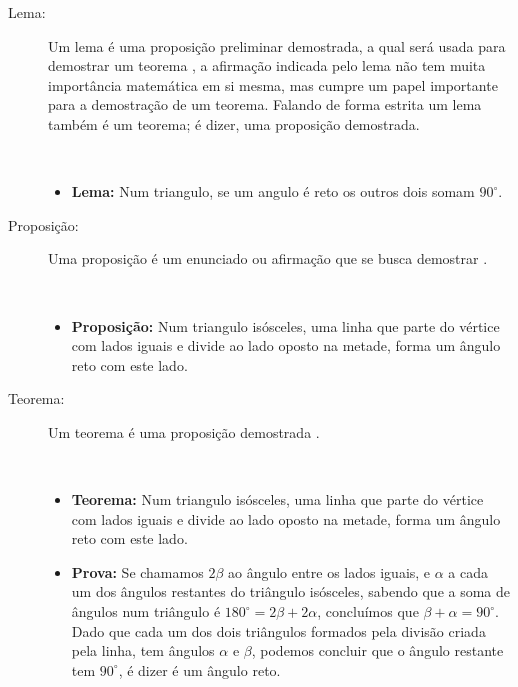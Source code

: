 \begin{description}
\item[Lema:]  Um lema é uma proposição preliminar demostrada, 
a qual será usada para demostrar um teorema \cite[pp. 49]{fossa2009introducao}\cite[pp. 41]{solow1987como},
a afirmação indicada pelo lema não tem muita importância matemática em si mesma, mas cumpre um papel importante para a demostração de um teorema.
Falando de forma estrita um lema também é um teorema; é dizer, uma proposição demostrada.
\begin{example}~\\
\begin{itemize}
\item \textbf{Lema:} Num triangulo, se um angulo é reto os outros dois somam $90^{\circ}$.
\end{itemize}
\end{example}

\item[Proposição:]  Uma proposição é um enunciado ou afirmação que se busca demostrar \cite[pp. 41]{solow1987como}.
\begin{example}~\\
\begin{itemize}
\item \textbf{Proposição:} Num triangulo isósceles, uma linha que parte do vértice com lados iguais e divide ao lado oposto na metade,
forma um ângulo reto com este lado.
\end{itemize}
\end{example}

\item[Teorema:]  Um teorema é uma proposição demostrada \cite[pp. 49]{fossa2009introducao} \cite[pp. 41]{solow1987como}.
\begin{example}~\\
\begin{itemize}
\item \textbf{Teorema:} Num triangulo isósceles, uma linha que parte do vértice com lados iguais e divide ao lado oposto na metade,
forma um ângulo reto com este lado.
\item \textbf{Prova:}  Se chamamos $2\beta$ ao ângulo entre os lados iguais, 
e $\alpha$ a cada um dos ângulos restantes do triângulo isósceles, sabendo
que a soma de ângulos num triângulo é $180^{\circ}=2\beta+2\alpha$,
concluímos que $\beta+\alpha=90^{\circ}$.
Dado que cada um dos dois triângulos formados pela divisão criada pela linha, tem ângulos $\alpha$ e $\beta$,
podemos concluir que o ângulo restante tem $90^{\circ}$, é dizer é um ângulo reto.
\end{itemize}
\end{example}


\end{description}
